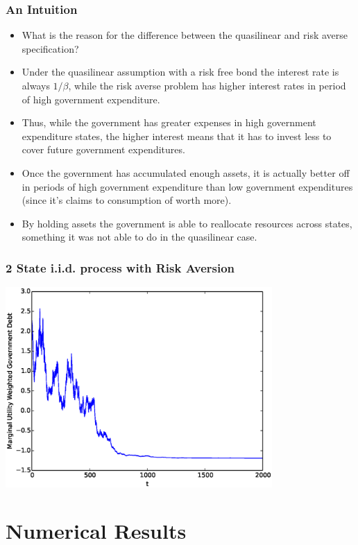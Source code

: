 \documentclass{beamer}
\begin{document}
% 
\begin{frame}
	\frametitle{An Intuition}
	\begin{itemize}
		\item  What is the reason for the difference between the quasilinear and risk averse specification?
		\item  Under the quasilinear assumption with a risk free bond the interest rate is always $1/\beta$, while the risk averse problem has higher interest rates in period of high government expenditure.
		\item  Thus, while the government has greater expenses in high government expenditure states, the higher interest means that it has to invest less to cover future government expenditures.
		\item  Once the government has accumulated enough assets, it is actually better off in periods of high government expenditure than low government expenditures (since it's claims to consumption of worth more).
		\item  By holding assets the government is able to reallocate resources across states, something it was not able to do in the quasilinear case.
	\end{itemize}
\end{frame}

\begin{frame}
	\frametitle{2 State i.i.d. process with Risk Aversion}
	\begin{center}
	\includegraphics[width=4in]{Images/2stateiid.eps}
	\end{center}
\end{frame}
  
\section{Numerical Results}
\end{document}
